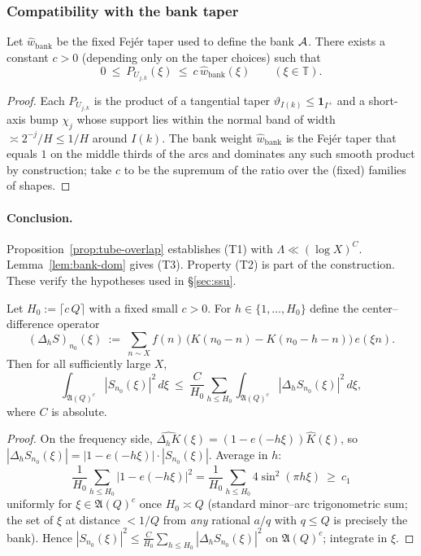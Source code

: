 \subsubsection{Compatibility with the bank taper}
\begin{lemma}\label{lem:bank-dom}
Let $\widehat w_{\mathrm{bank}}$ be the fixed Fejér taper used to define the bank $\mathcal{A}$.
There exists a constant $c>0$ (depending only on the taper choices) such that
\[
0\ \le\ P_{U_{j,k}}(\xi)\ \le\ c\,\widehat w_{\mathrm{bank}}(\xi)\qquad (\xi\in\mathbb T).
\]
\end{lemma}

\begin{proof}
Each $P_{U_{j,k}}$ is the product of a tangential taper $\vartheta_{I(k)}\le \mathbf 1_{I^{+}}$ and a short-axis bump
$\chi_j$ whose support lies within the normal band of width $\asymp 2^{-j}/H\le 1/H$ around $I(k)$.
The bank weight $\widehat w_{\mathrm{bank}}$ is the Fejér taper that equals $1$ on the middle thirds of the arcs and dominates any such smooth product by construction; take $c$ to be the supremum of the ratio over the (fixed) families of shapes.
\end{proof}

\paragraph*{Conclusion.}
Proposition~\ref{prop:tube-overlap} establishes (T1) with $\Lambda\ll (\log X)^C$. Lemma~\ref{lem:bank-dom} gives (T3).
Property (T2) is part of the construction. These verify the hypotheses used in §\ref{sec:ssu}.

\begin{lemma}\label{lem:minor-amp}
Let $H_0:=\lceil c\,Q\rceil$ with a fixed small $c>0$.
For $h\in\{1,\dots,H_0\}$ define the center–difference operator
\[
(\Delta_h S)_{n_0}(\xi)\ :=\ \sum_{n\sim X} f(n)\,\big(K(n_0-n)-K(n_0-h-n)\big)\,e(\xi n).
\]
Then for all sufficiently large $X$,
\[
\int_{\mathfrak A(Q)^c}\!|S_{n_0}(\xi)|^2\,d\xi
\ \le\ \frac{C}{H_0}\sum_{h\le H_0}\int_{\mathfrak A(Q)^c}\!|\Delta_h S_{n_0}(\xi)|^2\,d\xi,
\]
where $C$ is absolute.
\end{lemma}

\begin{proof}
On the frequency side, $\widehat{\Delta_h K}(\xi)=(1-e(-h\xi))\widehat K(\xi)$, so
$|\Delta_h S_{n_0}(\xi)|=|1-e(-h\xi)|\cdot |S_{n_0}(\xi)|$.
Average in $h$:
\[
\frac{1}{H_0}\sum_{h\le H_0}|1-e(-h\xi)|^2
=\frac{1}{H_0}\sum_{h\le H_0} 4\sin^2(\pi h\xi)
\ \ge\ c_1
\]
uniformly for $\xi\in\mathfrak A(Q)^c$ once $H_0\asymp Q$ (standard minor–arc trigonometric sum; the set of $\xi$ at distance $<\!1/Q$ from \emph{any} rational $a/q$ with $q\le Q$ is precisely the bank). Hence
\(
|S_{n_0}(\xi)|^2\le \tfrac{C}{H_0}\sum_{h\le H_0}|\Delta_h S_{n_0}(\xi)|^2
\)
on $\mathfrak A(Q)^c$; integrate in $\xi$.
\end{proof}


